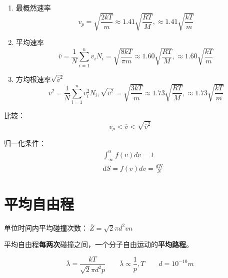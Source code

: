 \begin{enumerate}

    \item 最概然速率
          \begin{equation}
              v_p=\sqrt{\frac{2kT}{m}}\approx 1.41\sqrt{\frac{RT}{M}},\approx 1.41\sqrt{\frac{kT}{m}}
          \end{equation}

    \item 平均速率
          \begin{equation}
              \overline {v}=\frac{1}{N}\sum_{i=1}^n{v_iN_i}=\sqrt{\frac{8kT}{\pi m}}\approx 1.60\sqrt{\frac{RT}{M}},\approx 1.60\sqrt{\frac{kT}{m}}
          \end{equation}

    \item 方均根速率$\sqrt{\overline{v}^2}$
          \begin{equation}
              \overline{v}^2=\frac{1}{N}\sum_{i=1}^n{v_i^2N_i},\sqrt{\overline{v}^2}=\sqrt{\frac{3kT}{m}}\approx 1.73\sqrt{\frac{RT}{M}},\approx 1.73\sqrt{\frac{kT}{m}}
          \end{equation}

\end{enumerate}

比较：
\begin{equation}
    v_p<\overline{v}<\sqrt{\overline{v}^2}
\end{equation}

归一化条件：
\begin{equation}
    \begin{aligned}
         & \int^{0}_{\infty}{f(v)dv}=1 \\
         & dS=f(v)dv=\frac{dN}{N}
    \end{aligned}
\end{equation}

\section{平均自由程}

单位时间内平均碰撞次数：$~\overline{Z}=\sqrt{2}\pi{}d^2vn$

平均自由程\textbf{每两次}碰撞之间，一个分子自由运动的\textbf{平均路程}。

\begin{equation}
    \overline{\lambda}=\frac{kT}{\sqrt{2}\pi{}d^2p}\qquad\overline{\lambda{}}\propto\frac{1}{p},T\qquad d=10^{-10}m
\end{equation}

\newpage